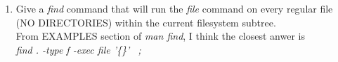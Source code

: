 \documentclass[a4paper,12pt]{article}
\begin{document}
\begin{enumerate}
\item Give a \textit{find} command that will run the \textit{file} command on every regular file (NO DIRECTORIES) within the current filesystem subtree.\\
	From EXAMPLES section of \textit{man find}, I think the closest anwer is \\ \textit{find . -type f -exec file '\{\}' \ ; } 

\end{enumerate}
\end{document}
